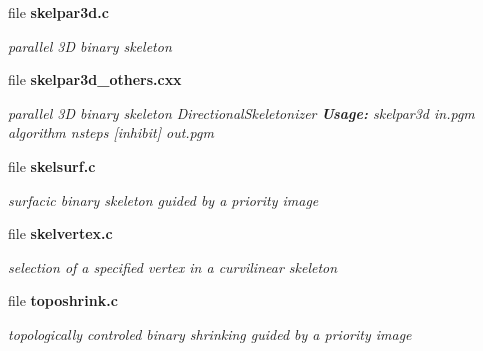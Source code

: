 \begin{CompactItemize}
\item 
file {\bf skelpar3d.c}
\begin{CompactList}\small\item\em parallel 3D binary skeleton \item\end{CompactList}

\item 
file {\bf skelpar3d\_\-others.cxx}
\begin{CompactList}\small\item\em parallel 3D binary skeleton DirectionalSkeletonizer {\bf Usage:} skelpar3d in.pgm algorithm nsteps [inhibit] out.pgm \item\end{CompactList}

\item 
file {\bf skelsurf.c}
\begin{CompactList}\small\item\em surfacic binary skeleton guided by a priority image \item\end{CompactList}

\item 
file {\bf skelvertex.c}
\begin{CompactList}\small\item\em selection of a specified vertex in a curvilinear skeleton \item\end{CompactList}

\item 
file {\bf toposhrink.c}
\begin{CompactList}\small\item\em topologically controled binary shrinking guided by a priority image \item\end{CompactList}

\end{CompactItemize}
